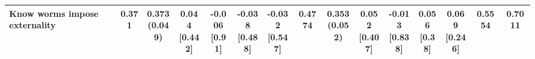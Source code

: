 {\begin{tabular}[t]{lcccccccccccccc}
\hspace{1em}Know worms impose externality & 0.371 & \makecell[c]{0.373\\(0.049)} & \makecell[c]{0.044\\{[0.442]}} & \makecell[c]{-0.006\\{[0.91]}} & \makecell[c]{-0.038\\{[0.488]}} & \makecell[c]{-0.032\\{[0.547]}} & 0.4774 & \makecell[c]{0.353\\(0.052)} & \makecell[c]{0.052\\{[0.407]}} & \makecell[c]{-0.013\\{[0.838]}} & \makecell[c]{0.056\\{[0.38]}} & \makecell[c]{0.069\\{[0.246]}} & 0.5554 & 0.7011\\
\bottomrule
\end{tabular}}


